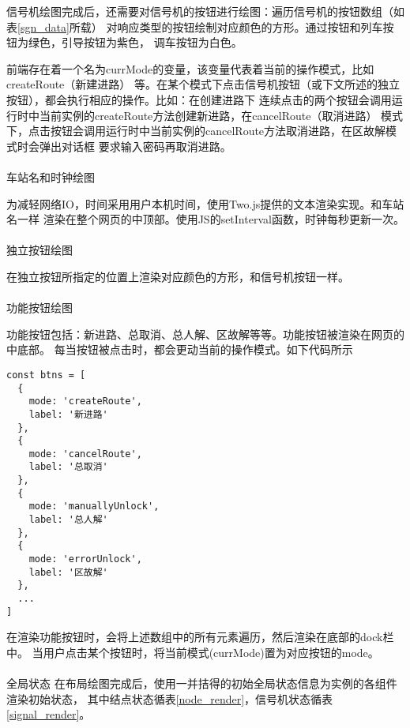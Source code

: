 信号机绘图完成后，还需要对信号机的按钮进行绘图：遍历信号机的按钮数组（如表\ref{sgn_data}所载）
对响应类型的按钮绘制对应颜色的方形。通过按钮和列车按钮为绿色，引导按钮为紫色，
调车按钮为白色。

前端存在着一个名为currMode的变量，该变量代表着当前的操作模式，比如createRoute（新建进路）
等。在某个模式下点击信号机按钮（或下文所述的独立按钮），都会执行相应的操作。比如：在创建进路下
连续点击的两个按钮会调用运行时中当前实例的createRoute方法创建新进路，在cancelRoute（取消进路）
模式下，点击按钮会调用运行时中当前实例的cancelRoute方法取消进路，在区故解模式时会弹出对话框
要求输入密码再取消进路。

\paragraph{}车站名和时钟绘图

为减轻网络IO，时间采用用户本机时间，使用Two.js提供的文本渲染实现。和车站名一样
渲染在整个网页的中顶部。使用JS的setInterval函数，时钟每秒更新一次。

\paragraph{}独立按钮绘图

在独立按钮所指定的位置上渲染对应颜色的方形，和信号机按钮一样。

\paragraph{}功能按钮绘图

功能按钮包括：新进路、总取消、总人解、区故解等等。功能按钮被渲染在网页的中底部。
每当按钮被点击时，都会更动当前的操作模式。如下代码所示
\begin{lstlisting}
const btns = [
  {
    mode: 'createRoute',
    label: '新进路'
  },
  {
    mode: 'cancelRoute',
    label: '总取消'
  },
  {
    mode: 'manuallyUnlock',
    label: '总人解'
  },
  {
    mode: 'errorUnlock',
    label: '区故解'
  },
  ...
]
\end{lstlisting}

在渲染功能按钮时，会将上述数组中的所有元素遍历，然后渲染在底部的dock栏中。
当用户点击某个按钮时，将当前模式(currMode)置为对应按钮的mode。

\paragraph{} 全局状态
在布局绘图完成后，使用一并拮得的初始全局状态信息为实例的各组件渲染初始状态，
其中结点状态循表\ref{node_render}，信号机状态循表\ref{signal_render}。

